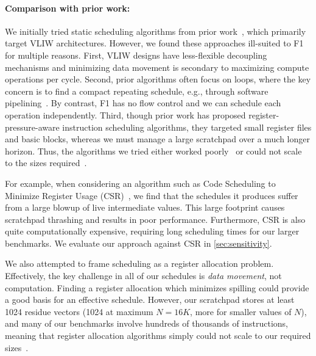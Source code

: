 \paragraph{Comparison with prior work:}
We initially tried static sched\-uling algorithms from prior work~\cite{blelloch:acm1999:provably,marchal:jpdc2019:limiting,goodman:ics1988:code,ozer:micro1998:unified,barany:odes2011:register},
which primarily target VLIW architectures.
However, we found these approaches ill-suited to F1 for multiple reasons.
First, VLIW designs have less-flexible decoupling mechanisms
and minimizing data movement is secondary to maximizing compute operations per cycle.
Second, prior algorithms often focus on loops,
where the key concern is to find a compact repeating schedule,
e.g., through software pipelining~\cite{lam1989software}.
By contrast, F1 has no flow control and we can 
schedule each operation independently.
Third, though prior work has proposed register-pressure-aware
instruction scheduling algorithms,
they targeted small register files and basic blocks,
whereas we must manage a large scratchpad over a much longer horizon.
Thus, the algorithms we tried either worked poorly~\cite{ozer:micro1998:unified, goodman:ics1988:code, marchal:jpdc2019:limiting} or could not scale to the sizes required~\cite{barany:odes2011:register, xu:sigplan2007:tetris, touati:ijpp2005:register, berson:pact1993:ursa}.

For example, when considering an algorithm such as Code Scheduling to Minimize Register Usage (CSR)~\cite{goodman:ics1988:code}, we find that the schedules it produces suffer from a large blowup of live intermediate values. This large footprint causes scratchpad thrashing and results in poor performance. Furthermore, CSR is also quite computationally expensive, requiring long scheduling times for our larger benchmarks. We evaluate our approach against CSR in \autoref{sec:sensitivity}.

We also attempted to frame scheduling as a register allocation problem. Effectively, the key challenge in all of our schedules is \emph{data movement}, not computation. Finding a register allocation which minimizes spilling could provide a good basis for an effective schedule. However, our scratchpad stores at least 1024 residue vectors (1024 at maximum $N = 16K$, more for smaller values of $N$), and many of our benchmarks involve hundreds of thousands of instructions, meaning that register allocation algorithms simply could not scale to our required sizes~\cite{barany:odes2011:register, xu:sigplan2007:tetris, touati:ijpp2005:register, berson:pact1993:ursa}. 

